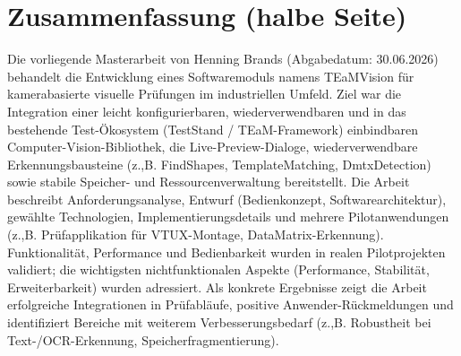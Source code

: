 \documentclass[a4paper,11pt]{article}
\begin{document}
  \section*{Zusammenfassung (halbe Seite)} Die vorliegende
  Masterarbeit von Henning Brands (Abgabedatum: 30.06.2026) behandelt
  die Entwicklung eines Softwaremoduls namens TEaMVision für
  kamerabasierte visuelle Prüfungen im industriellen Umfeld. Ziel war
  die Integration einer leicht konfigurierbaren, wiederverwendbaren
  und in das bestehende Test-Ökosystem (TestStand / TEaM-Framework)
  einbindbaren Computer-Vision-Bibliothek, die Live-Preview-Dialoge,
  wiederverwendbare Erkennungsbausteine (z.,B. FindShapes,
  TemplateMatching, DmtxDetection) sowie stabile Speicher- und
  Ressourcenverwaltung bereitstellt. Die Arbeit beschreibt
  Anforderungsanalyse, Entwurf (Bedienkonzept, Softwarearchitektur),
  gewählte Technologien, Implementierungsdetails und mehrere
  Pilotanwendungen (z.,B. Prüfapplikation für VTUX-Montage,
  DataMatrix-Erkennung). Funktionalität, Performance und Bedienbarkeit
  wurden in realen Pilotprojekten validiert; die wichtigsten
  nichtfunktionalen Aspekte (Performance, Stabilität, Erweiterbarkeit)
  wurden adressiert. Als konkrete Ergebnisse zeigt die Arbeit
  erfolgreiche Integrationen in Prüfabläufe, positive
  Anwender-Rückmeldungen und identifiziert Bereiche mit weiterem
  Verbesserungsbedarf (z.,B. Robustheit bei Text-/OCR-Erkennung,
  Speicherfragmentierung).
\end{document}

